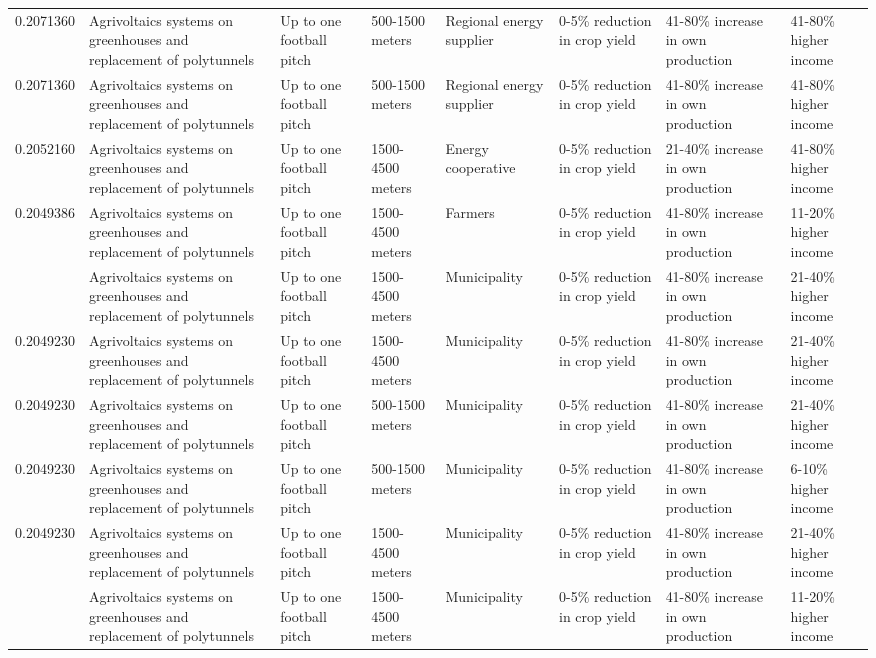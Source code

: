 \begin{table}
\begin{tabular}[t]{rlllllll}
0.2071360 & Agrivoltaics systems on greenhouses
and replacement of polytunnels & Up to one football pitch & 500-1500 meters & Regional energy supplier & 0-5\% reduction in crop yield & 41-80\% increase in own production & 41-80\% higher income\\
0.2071360 & Agrivoltaics systems on greenhouses
and replacement of polytunnels & Up to one football pitch & 500-1500 meters & Regional energy supplier & 0-5\% reduction in crop yield & 41-80\% increase in own production & 41-80\% higher income\\
0.2052160 & Agrivoltaics systems on greenhouses
and replacement of polytunnels & Up to one football pitch & 1500-4500 meters & Energy cooperative & 0-5\% reduction in crop yield & 21-40\% increase in own production & 41-80\% higher income\\
0.2049386 & Agrivoltaics systems on greenhouses
and replacement of polytunnels & Up to one football pitch & 1500-4500 meters & Farmers & 0-5\% reduction in crop yield & 41-80\% increase in own production & 11-20\% higher income\\
\addlinespace
0.2049230 & Agrivoltaics systems on greenhouses
and replacement of polytunnels & Up to one football pitch & 1500-4500 meters & Municipality & 0-5\% reduction in crop yield & 41-80\% increase in own production & 21-40\% higher income\\
0.2049230 & Agrivoltaics systems on greenhouses
and replacement of polytunnels & Up to one football pitch & 1500-4500 meters & Municipality & 0-5\% reduction in crop yield & 41-80\% increase in own production & 21-40\% higher income\\
0.2049230 & Agrivoltaics systems on greenhouses
and replacement of polytunnels & Up to one football pitch & 500-1500 meters & Municipality & 0-5\% reduction in crop yield & 41-80\% increase in own production & 21-40\% higher income\\
0.2049230 & Agrivoltaics systems on greenhouses
and replacement of polytunnels & Up to one football pitch & 500-1500 meters & Municipality & 0-5\% reduction in crop yield & 41-80\% increase in own production & 6-10\% higher income\\
0.2049230 & Agrivoltaics systems on greenhouses
and replacement of polytunnels & Up to one football pitch & 1500-4500 meters & Municipality & 0-5\% reduction in crop yield & 41-80\% increase in own production & 21-40\% higher income\\
\addlinespace
0.2049230 & Agrivoltaics systems on greenhouses
and replacement of polytunnels & Up to one football pitch & 1500-4500 meters & Municipality & 0-5\% reduction in crop yield & 41-80\% increase in own production & 11-20\% higher income\\

\end{tabular}
\end{table}
